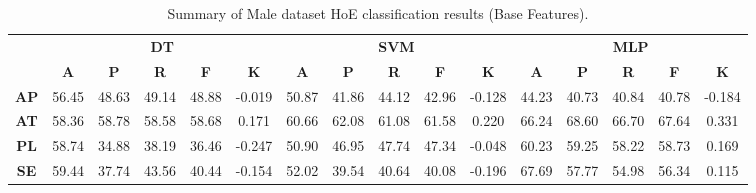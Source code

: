 \begin{landscape}
\begin{table}[htbp]
\footnotesize
\centering
\caption{Summary of Male dataset HoE classification results (Base Features).}
\label{tab:base_hoe_male}
\begin{tabular}{|c|c|c|c|c|c|c|c|c|c|c|c|c|c|c|c|}
\hline
\multirow{2}{*}{}	& \multicolumn{5}{c|}{\textbf{DT}}												& \multicolumn{5}{c|}{\textbf{SVM}}												& \multicolumn{5}{c|}{\textbf{MLP}}												\\ \cline{2-16} 
					& \textbf{A}	& \textbf{P}	& \textbf{R}	& \textbf{F}	& \textbf{K}	& \textbf{A}	& \textbf{P}	& \textbf{R}	& \textbf{F}	& \textbf{K}	& \textbf{A}	& \textbf{P}	& \textbf{R}	& \textbf{F}	& \textbf{K}	\\ \hline
\textbf{AP}			& 56.45			& 48.63			& 49.14			& 48.88			& -0.019			& 50.87			& 41.86			& 44.12			& 42.96			& -0.128			& 44.23			& 40.73			& 40.84			& 40.78			& -0.184			\\ \hline
\textbf{AT}			& 58.36			& 58.78			& 58.58			& 58.68			& 0.171			& 60.66			& 62.08			& 61.08			& 61.58			& 0.220			& 66.24			& 68.60			& 66.70			& 67.64			& 0.331			\\ \hline
\textbf{PL}			& 58.74			& 34.88			& 38.19			& 36.46			& -0.247			& 50.90			& 46.95			& 47.74			& 47.34			& -0.048			& 60.23			& 59.25			& 58.22			& 58.73			& 0.169			\\ \hline
\textbf{SE}			& 59.44			& 37.74			& 43.56			& 40.44			& -0.154			& 52.02			& 39.54			& 40.64			& 40.08			& -0.196			& 67.69			& 57.77			& 54.98			& 56.34			& 0.115			\\ \hline
\end{tabular}
\end{table}
\end{landscape}